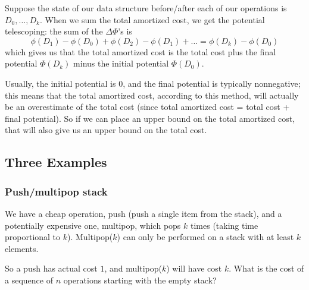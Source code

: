 \documentclass{article}
\begin{document}
\begin{enumerate}
	Suppose the state of our data structure before/after each of 
	our operations is $D_0, \ldots, D_k$.
	When we sum the total amortized cost, we get the potential telescoping: 
	the sum
	of the $\Delta\Phi$'s is 
	$$
	\phi(D_1) - \phi(D_0) + \phi(D_2) - \phi (D_1) + \ldots
	= \phi(D_k) - \phi(D_0)
	$$
	which gives us that the total amortized cost is the
	total cost plus the final potential $\Phi(D_k)$ minus the initial potential $\Phi(D_0)$.
	
	Usually, the initial potential is $0$, and the final potential is
	typically nonnegative; this means that the total amortized cost,
	according to this method, will actually be an overestimate of the
	total cost (since total amortized cost = total cost + final potential).
	So if we can place an upper bound on the total amortized cost, that will
	also give us an upper bound on the total cost.
	
\end{enumerate}




\subsection{Three Examples}

\subsubsection{Push/multipop stack}

We have a cheap operation, push (push a single item from the stack),
and a potentially expensive one, multipop, which pops $k$ times 
(taking time proportional to $k$).
Multipop($k$) can only be performed on a stack with at least $k$ elements.

So a push has actual cost $1$, and multipop($k$) will have cost $k$.
What is the cost of a sequence of $n$ operations starting with
the empty stack?
\end{document}

